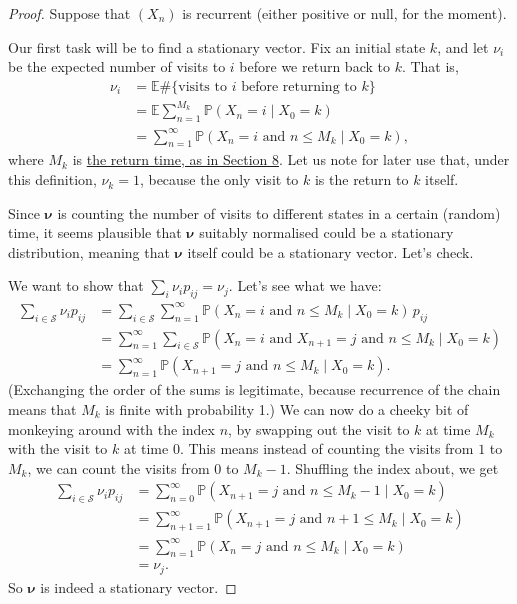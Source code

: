 \documentclass[
  a4paper,
]{article}
\theoremstyle{definition}
\theoremstyle{definition}
\theoremstyle{definition}
\theoremstyle{remark}
\begin{document}
\begin{proof}

Suppose that \((X_n)\) is recurrent (either positive or null, for the moment).

Our first task will be to find a stationary vector. Fix an initial state \(k\), and let \(\nu_i\) be the expected number of visits to \(i\) before we return back to \(k\). That is,
\begin{align*}
\nu_i &= \mathbb E \# \{\text{visits to $i$ before returning to $k$}\} \\
      &= \mathbb E \sum_{n=1}^{M_k} \mathbb P(X_n = i \mid X_0 = k) \\
      &= \sum_{n=1}^\infty \mathbb P(X_n = i \text{ and } n \leq M_k \mid X_0 = k)  ,
\end{align*}
where \(M_k\) is \protect\hyperlink{S08-return-times}{the return time, as in Section 8}.
Let us note for later use that, under this definition, \(\nu_k = 1\), because the only visit to \(k\) is the return to \(k\) itself.

Since \(\boldsymbol\nu\) is counting the number of visits to different states in a certain (random) time, it seems plausible that \(\boldsymbol\nu\) suitably normalised could be a stationary distribution, meaning that \(\boldsymbol\nu\) itself could be a stationary vector. Let's check.

We want to show that \(\sum_i \nu_i p_{ij} = \nu_j\). Let's see what we have:
\begin{align*}
\sum_{i \in \mathcal S} \nu_i p_{ij} &= \sum_{i \in \mathcal S} \sum_{n=1}^\infty \mathbb P(X_n = i \text{ and } n \leq M_k \mid X_0 = k) \, p_{ij} \\
&= \sum_{n=1}^\infty \sum_{i \in \mathcal S} \mathbb P(X_n = i \text{ and } X_{n+1} = j \text{ and } n \leq M_k \mid X_0 = k) \\
&= \sum_{n=1}^\infty \mathbb P(X_{n+1} = j \text{ and } n \leq M_k \mid X_0 = k) .
\end{align*}
(Exchanging the order of the sums is legitimate, because recurrence of the chain means that \(M_k\) is finite with probability 1.)
We can now do a cheeky bit of monkeying around with the index \(n\), by swapping out the visit to \(k\) at time \(M_k\) with the visit to \(k\) at time \(0\). This means instead of counting the visits from \(1\) to \(M_k\), we can count the visits from \(0\) to \(M_k - 1\). Shuffling the index about, we get
\begin{align*}
\sum_{i \in \mathcal S} \nu_i p_{ij} &= \sum_{n=0}^\infty \mathbb P(X_{n+1} = j \text{ and } n \leq M_k-1 \mid X_0 = k) \\
&= \sum_{n+1=1}^\infty \mathbb P(X_{n+1} = j \text{ and } n+1 \leq M_k \mid X_0 = k) \\
&= \sum_{n=1}^\infty \mathbb P(X_{n} = j \text{ and } n \leq M_k \mid X_0 = k) \\
&= \nu_j .
\end{align*}
So \(\boldsymbol\nu\) is indeed a stationary vector.


\end{proof}
\end{document}
